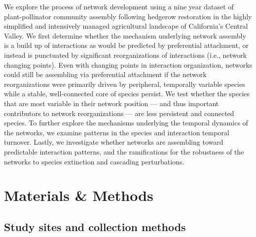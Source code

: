 \documentclass[12pt]{article}
\begin{document}
We explore the process of network development using a nine year
dataset of plant-pollinator community assembly following hedgerow
restoration in the highly simplified and intensively managed
agricultural landscape of California's Central Valley.  We first
determine whether the mechanism underlying network assembly is a build
up of interactions as would be predicted by preferential attachment,
or instead is punctuated by significant reorganizations of
interactions (i.e., network changing points). Even with changing
points in interaction organization, networks could still be assembling
via preferential attachment if the network reorganizations were
primarily driven by peripheral, temporally variable species while a
stable, well-connected core of species persist. We test whether the
species that are most variable in their network position --- and thus
important contributors to network reorganizations --- are less
persistent and connected species. To further explore the mechanisms
underlying the temporal dynamics of the networks, we examine patterns
in the species and interaction temporal turnover. Lastly, we
investigate whether networks are assembling toward predictable
interaction patterns, and the ramifications for the robustness of the
networks to species extinction and cascading perturbations.


\section*{Materials \& Methods}
\label{sec:methods}

\subsection*{Study sites and collection methods}
\label{sec:study-sites}
\end{document}
